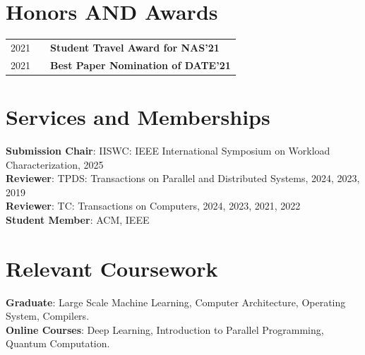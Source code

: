 \documentclass[letterpaper,11pt]{article}
\begin{document}
\section{Honors AND Awards}

\begin{tabular}{lll}
2021 & \hspace{1cm} &\textbf{Student Travel Award for NAS'21}\\
2021 & \hspace{1cm} &\textbf{Best Paper Nomination of DATE'21}
\end{tabular}


\section{Services and Memberships}
\textbf{Submission Chair}:  IISWC:  IEEE International Symposium on Workload Characterization, 2025\\
\textbf{Reviewer}: TPDS: Transactions on Parallel and Distributed Systems, 2024, 2023, 2019\\
\textbf{Reviewer}: TC: Transactions on Computers, 2024, 2023, 2021, 2022\\
\textbf{Student Member}: ACM, IEEE



\section{Relevant Coursework}
\textbf{Graduate}: Large Scale Machine Learning, Computer Architecture, Operating System, Compilers. \\
\textbf{Online Courses}: Deep Learning, Introduction to Parallel Programming, Quantum Computation.


\end{document}
